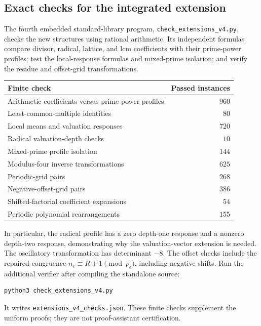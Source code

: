\subsection{Exact checks for the integrated extension}
The fourth embedded standard-library program,
\texttt{check\_extensions\_v4.py}, checks the new structures using
rational arithmetic. Its independent formulas compare divisor,
radical, lattice, and lcm coefficients with their prime-power profiles;
test the local-response formulas and mixed-prime isolation; and verify
the residue and offset-grid transformations.
\begin{center}
\begin{tabular}{lr}
\toprule
Finite check & Passed instances\\
\midrule
Arithmetic coefficients versus prime-power profiles & $960$\\
Least-common-multiple identities & $80$\\
Local means and valuation responses & $720$\\
Radical valuation-depth checks & $10$\\
Mixed-prime profile isolation & $144$\\
Modulus-four inverse transformations & $625$\\
Periodic-grid pairs & $268$\\
Negative-offset-grid pairs & $386$\\
Shifted-factorial coefficient expansions & $54$\\
Periodic polynomial rearrangements & $155$\\
\bottomrule
\end{tabular}
\end{center}
In particular, the radical profile has a zero depth-one response and
a nonzero depth-two response, demonstrating why the valuation-vector
extension is needed. The oscillatory transformation has determinant
$-8$. The offset checks include the repaired congruence
$n_e\equiv R+1\pmod{p_e}$, including negative shifts.
Run the additional verifier after compiling the standalone source:
\begin{lstlisting}
python3 check_extensions_v4.py
\end{lstlisting}
It writes \texttt{extensions\_v4\_checks.json}. These finite checks
supplement the uniform proofs; they are not proof-assistant certification.


